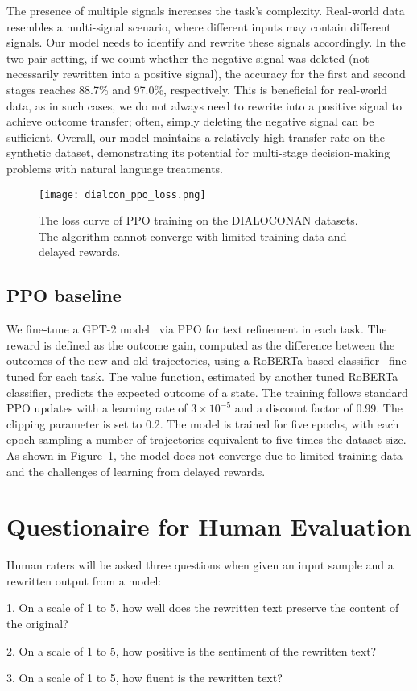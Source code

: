\documentclass{article}
\begin{document}
The presence of multiple signals increases the task’s complexity. Real-world data resembles a multi-signal scenario, where different inputs may contain different signals. Our model needs to identify and rewrite these signals accordingly. In the two-pair setting, if we count whether the negative signal was deleted (not necessarily rewritten into a positive signal), the accuracy for the first and second stages reaches 88.7\% and 97.0\%, respectively. This is beneficial for real-world data, as in such cases, we do not always need to rewrite into a positive signal to achieve outcome transfer; often, simply deleting the negative signal can be sufficient. Overall, our model maintains a relatively high transfer rate on the synthetic dataset, demonstrating its potential for multi-stage decision-making problems with natural language treatments.

\begin{figure}[h]
\begin{small}
    \centering
    \texttt{[image: dialcon\_ppo\_loss.png]}
    \caption{The loss curve of PPO training on the DIALOCONAN datasets. The algorithm cannot converge with limited training data and delayed rewards.}
    \label{fig:ppo-loss}
    \end{small}
\end{figure}
\subsection{PPO baseline}\label{app:ppo}
We fine-tune a GPT-2 model~\cite{radford2019language} via PPO for text refinement in each task. The reward is defined as the outcome gain, computed as the difference between the outcomes of the new and old trajectories, using a RoBERTa-based classifier~\cite{liu2019roberta} fine-tuned for each task. The value function, estimated by another tuned RoBERTa classifier, predicts the expected outcome of a state. The training follows standard PPO updates with a learning rate of $3 \times 10^{-5}$ and a discount factor of 0.99. The clipping parameter is set to 0.2. The model is trained for five epochs, with each epoch sampling a number of trajectories equivalent to five times the dataset size. As shown in Figure~\ref{fig:ppo-loss}, the model does not converge due to limited training data and the challenges of learning from delayed rewards.


\section{Questionaire for Human Evaluation}\label{app:human-eval}
Human raters will be asked three questions when given an input sample and a rewritten output from a model:

1. On a scale of 1 to 5, how well does the rewritten text preserve the content of the original?

2. On a scale of 1 to 5, how positive is the sentiment of the rewritten text?

3. On a scale of 1 to 5, how fluent is the rewritten text?
\end{document}
